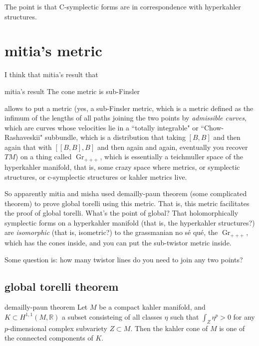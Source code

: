 The point is that C-symplectic forms are in correspondence with hyperkahler structures.

\section{mitia's metric}

I think that mitia's result that
\begin{thing6}{mitia's result}\leavevmode
The cone metric is sub-Finsler
\end{thing6}
allows to put a metric (yes, a sub-Finsler metric, which is a metric defined as the infimum of the lengths of all paths joining the two points by \textit{admissible curves}, which are curves whose velocities lie in a ``totally integrable" or ``Chow-Rashaveskii" subbundle, which is a distribution that taking \([B,B]\) and then again that with \([[B,B],B]\) and then again and again, eventually you recover \(TM\)) on a thing called \(\operatorname{Gr}_{+++}\), which is essentially a teichmuller space of the hyperkahler manifold, that is, some crazy space where metrics, or symplectic structures, or c-symplectic structures or kahler metrics live.

So apparently mitia and misha used demailly-paun theorem (some complicated theorem) to prove global torelli using this metric. That is, this metric facilitates the proof of global torelli. What's the point of global? That holomorphically symplectic forms on a hyperkahler manifold (that is, the hyperkahler structures?) are \textit{isomorphic} (that is, isometric?) to the grassmanian no sé qué, the \(\operatorname{Gr}_{+++}\), which has the cones inside, and you can put the sub-twistor metric inside.

Some question is: how many twistor lines do you need to join any two points?

\subsection{global torelli theorem}

\begin{thing6}{demailly-paun theorem}\leavevmode
Let \(M\) be a compact kahler manifold, and \(K \subset H^{1,1}(M,\mathbb{R})\) a subset consisteing of all classes \(\eta\) such that \(\int_Z \eta^p >0\) for any \(p\)-dimensional complex subvariety \(Z \subset M\). Then the kahler cone of \(M\) is one of the connected components of \(K\).
\end{thing6}

